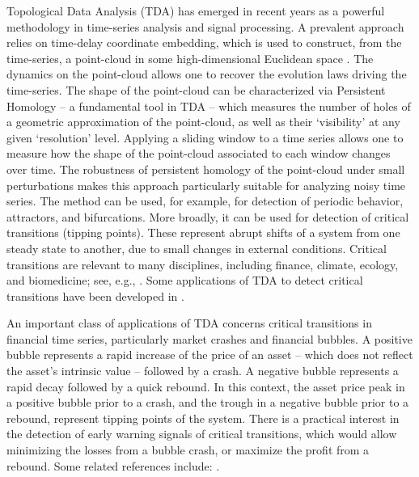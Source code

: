 \documentclass[11pt]{amsart}
\theoremstyle{definition}
\theoremstyle{remark}
\numberwithin{equation}{section}
\begin{document}
Topological Data Analysis (TDA) has emerged in recent years as a powerful methodology in time-series analysis and signal
processing. A prevalent approach relies on time-delay coordinate embedding, which is used to construct, from the time-series, a point-cloud in some high-dimensional Euclidean space \cite{takens1981detecting}.
The dynamics on the point-cloud allows one to recover the evolution laws driving the time-series.
The shape of the point-cloud can be characterized via  Persistent Homology -- a fundamental tool in TDA -- which measures the number of holes of a geometric  approximation of  the point-cloud, as well as their `visibility' at any given `resolution' level.
Applying a sliding window to a time series allows one to measure how the shape of the point-cloud associated to each window changes over time.
The robustness of persistent homology of the point-cloud under small perturbations makes this approach particularly suitable for analyzing noisy time series.
The method can be used, for example, for  detection of periodic behavior,  attractors, and bifurcations. More broadly, it can be used for detection of critical transitions (tipping points). These represent abrupt shifts of a system
from one steady state to another, due to  small changes in external
conditions.
Critical transitions are relevant to many disciplines, including
finance,  climate, ecology, and biomedicine; see, e.g., \cite{scheffer2009early,lenton2011early,thompson2011climate,dakos2012methods,bury2021deep}.
Some applications of TDA  to detect critical transitions have been developed in \cite{berwald2014automatic,berwald2014critical,saggar2018towards,islambekov2020harnessing,dindin2020topological}.

An important class of applications of TDA concerns critical transitions in financial time series, particularly market crashes and financial bubbles.
A  positive bubble represents a rapid increase of the price of an  asset  -- which does not reflect the asset’s intrinsic value -- followed by a crash.
A negative bubble  represents a rapid decay followed by a quick rebound. In this context, the asset price peak in a positive bubble prior to a crash, and the
trough in a negative bubble prior to a rebound, represent tipping points of the system.
There is a practical interest in the detection of early warning signals of critical transitions, which would allow  minimizing  the losses from a bubble crash, or maximize the profit from a rebound.
Some related references include:  \cite{phillips2011dating,yan2012diagnosis,fry2016negative,gidea2017topological,gidea2018topological,gidea2020topological,katz2021time,
rudkin2021uncertainty,dlotko2021financial}.
\end{document}
